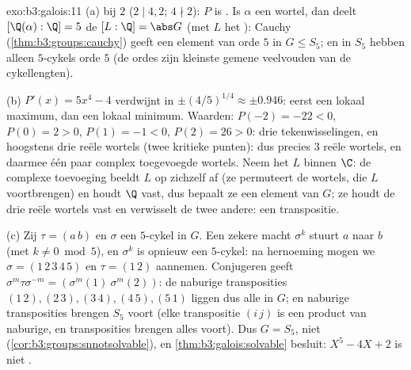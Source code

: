 \begin{solution}{exo:b3:galois:11}
(a)  bij $2$ ($2 \mid 4, 2$; $4 \nmid 2$): $P$ is
. Is $\alpha$ een wortel, dan deelt $[\Q(\alpha):\Q] =
5$ de  $[L:\Q] = \abs G$ (met $L$ het ):
Cauchy (\cref{thm:b3:groups:cauchy}) geeft een element van orde
$5$ in $G \leq S_5$; en in $S_5$ hebben alleen $5$-cykels orde $5$
(de ordes zijn kleinste gemene veelvouden van de cykellengten).

(b) $P'(x) = 5x^4 - 4$ verdwijnt in $\pm(4/5)^{1/4} \approx \pm
0.946$: eerst een lokaal maximum, dan een lokaal minimum. Waarden:
$P(-2) = -22 < 0$, $P(0) = 2 > 0$, $P(1) = -1 < 0$, $P(2) = 26 >
0$: drie tekenwisselingen, en hoogstens drie reële wortels (twee
kritieke punten): dus precies $3$ reële wortels, en daarmee één
paar complex toegevoegde wortels. Neem het  $L$
binnen $\C$: de complexe toevoeging beeldt $L$ op zichzelf af (ze
permuteert de wortels, die $L$ voortbrengen) en houdt $\Q$ vast,
dus bepaalt ze een element van $G$; ze houdt de drie reële wortels
vast en verwisselt de twee andere: een transpositie.

(c) Zij $\tau = (a\,b)$ en $\sigma$ een $5$-cykel in $G$. Een
zekere macht $\sigma^k$ stuurt $a$ naar $b$ (met $k \ne 0 \bmod
5$), en $\sigma^k$ is opnieuw een $5$-cykel: na hernoeming mogen
we $\sigma = (1\,2\,3\,4\,5)$ en $\tau = (1\,2)$ aannemen.
Conjugeren geeft $\sigma^m\tau\sigma^{-m} = (\sigma^m(1)\
\sigma^m(2))$: de naburige transposities $(1\,2), (2\,3), (3\,4),
(4\,5), (5\,1)$ liggen dus alle in $G$; en naburige transposities
brengen $S_5$ voort (elke transpositie $(i\,j)$ is een product van
naburige, en transposities brengen alles voort). Dus $G = S_5$,
niet  (\cref{cor:b3:groups:snnotsolvable}), en
\cref{thm:b3:galois:solvable} besluit: $X^5 - 4X + 2$ is niet
.
\end{solution}


